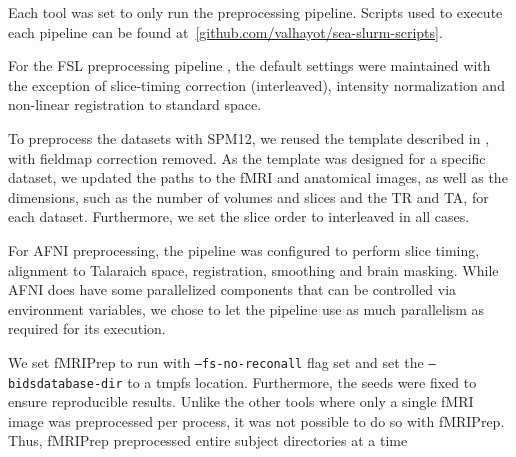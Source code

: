     Each tool was set to only run the preprocessing pipeline. Scripts used to execute each pipeline can be found at~\ref{github.com/valhayot/sea-slurm-scripts}.
    
    For the FSL preprocessing pipeline , the default settings were maintained with the exception of slice-timing correction (interleaved),
    intensity normalization and non-linear registration to standard space.
    

    To preprocess the datasets with SPM12, we reused the template described in \cite{haitas2021}, with fieldmap correction removed.
    As the template was designed for a specific dataset, we updated the paths to the fMRI and anatomical images,
    as well as the dimensions, such as the number of volumes and slices and the TR and TA, for each dataset. Furthermore,
    we set the slice order to interleaved in all cases. 
    
    For AFNI preprocessing, the pipeline was configured to perform slice timing, alignment to Talaraich space, registration, smoothing
    and brain masking. While AFNI does have some parallelized components that can be controlled via environment variables, we chose to let 
    the pipeline use as much parallelism as required for its execution.
    
    We set fMRIPrep to run with \texttt{--fs-no-reconall} flag set and set the \texttt{--bids\-database-dir} to a tmpfs location. 
    Furthermore, the seeds were fixed to ensure reproducible results. Unlike the other tools where only a single fMRI image was preprocessed
    per process, it was not possible to do so with fMRIPrep. Thus, fMRIPrep preprocessed entire subject directories at a time

    
